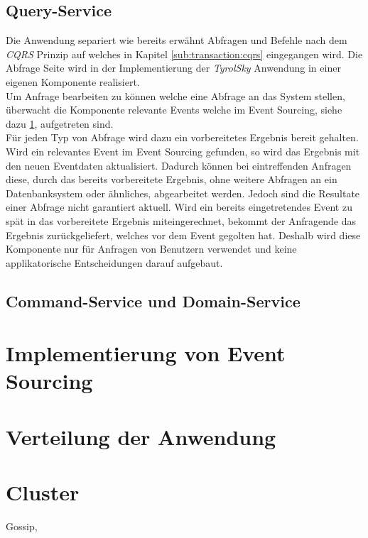 \subsection{Query-Service}
Die Anwendung separiert wie bereits erwähnt Abfragen und Befehle nach dem \textit{CQRS} Prinzip auf welches in Kapitel \ref{sub:transaction:cqrs} eingegangen wird. Die Abfrage Seite wird in der Implementierung der \textit{TyrolSky} Anwendung in einer eigenen Komponente realisiert. \\
Um Anfrage bearbeiten zu können welche eine Abfrage an das System stellen, überwacht die Komponente relevante Events welche im Event Sourcing, siehe dazu \ref{subsec:implementation:eventSouring}, aufgetreten sind. \\
Für jeden Typ von Abfrage wird dazu ein vorbereitetes Ergebnis bereit gehalten. Wird ein relevantes Event im Event Sourcing gefunden, so wird das Ergebnis mit den neuen Eventdaten aktualisiert. Dadurch können bei eintreffenden Anfragen diese, durch das bereits vorbereitete Ergebnis, ohne weitere Abfragen an ein Datenbanksystem oder ähnliches, abgearbeitet werden. Jedoch sind die Resultate einer Abfrage nicht garantiert aktuell. Wird ein bereits eingetretendes Event zu spät in das vorbereitete Ergebnis miteingerechnet, bekommt der Anfragende das Ergebnis zurückgeliefert, welches vor dem Event gegolten hat. Deshalb wird diese Komponente nur für Anfragen von Benutzern verwendet und keine applikatorische Entscheidungen darauf aufgebaut.


\subsection{Command-Service und Domain-Service}

\section{Implementierung von Event Sourcing}
\label{subsec:implementation:eventSouring}

\section{Verteilung der Anwendung}
\label{subsec:implementation:ApplicationDistribution}

\section{Cluster}
\label{subsec:implementation:gossip}
Gossip, 

